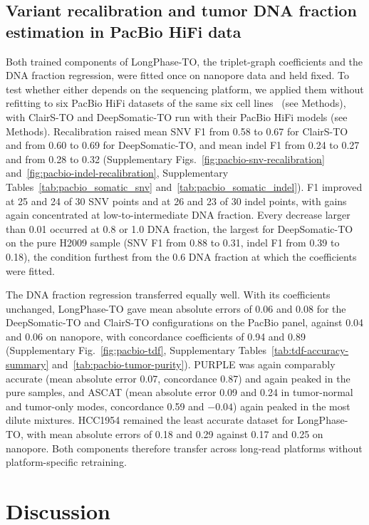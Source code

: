 \documentclass[pdflatex,sn-nature]{sn-jnl}
\begin{document}
\subsection{Variant recalibration and tumor DNA fraction estimation in PacBio HiFi data}
Both trained components of LongPhase-TO, the triplet-graph coefficients and the DNA fraction regression, were fitted once on nanopore data and held fixed. To test whether either depends on the sequencing platform, we applied them without refitting to six PacBio HiFi datasets of the same six cell lines~\cite{park2024} (see Methods), with ClairS-TO and DeepSomatic-TO run with their PacBio HiFi models (see Methods). Recalibration raised mean SNV F1 from 0.58 to 0.67 for ClairS-TO and from 0.60 to 0.69 for DeepSomatic-TO, and mean indel F1 from 0.24 to 0.27 and from 0.28 to 0.32 (Supplementary Figs.~\ref{fig:pacbio-snv-recalibration} and~\ref{fig:pacbio-indel-recalibration}, Supplementary Tables~\ref{tab:pacbio_somatic_snv} and~\ref{tab:pacbio_somatic_indel}). F1 improved at 25 and 24 of 30 SNV points and at 26 and 23 of 30 indel points, with gains again concentrated at low-to-intermediate DNA fraction. Every decrease larger than 0.01 occurred at 0.8 or 1.0 DNA fraction, the largest for DeepSomatic-TO on the pure H2009 sample (SNV F1 from 0.88 to 0.31, indel F1 from 0.39 to 0.18), the condition furthest from the 0.6 DNA fraction at which the coefficients were fitted.

The DNA fraction regression transferred equally well. With its coefficients unchanged, LongPhase-TO gave mean absolute errors of 0.06 and 0.08 for the DeepSomatic-TO and ClairS-TO configurations on the PacBio panel, against 0.04 and 0.06 on nanopore, with concordance coefficients of 0.94 and 0.89 (Supplementary Fig.~\ref{fig:pacbio-tdf}, Supplementary Tables~\ref{tab:tdf-accuracy-summary} and~\ref{tab:pacbio-tumor-purity}). PURPLE was again comparably accurate (mean absolute error 0.07, concordance 0.87) and again peaked in the pure samples, and ASCAT (mean absolute error 0.09 and 0.24 in tumor-normal and tumor-only modes, concordance 0.59 and $-0.04$) again peaked in the most dilute mixtures. HCC1954 remained the least accurate dataset for LongPhase-TO, with mean absolute errors of 0.18 and 0.29 against 0.17 and 0.25 on nanopore. Both components therefore transfer across long-read platforms without platform-specific retraining.

\section{Discussion}
\end{document}
